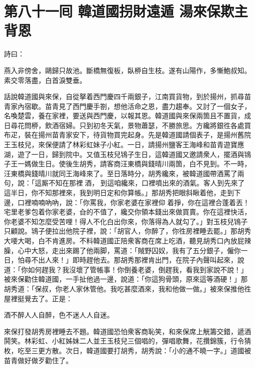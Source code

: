 
\chapter*{第八十一囘 韓道國拐財遠遁 湯來保欺主背恩}


詩曰：

燕入非傍舍，鷗歸只故池。斷橋無復板，臥桺自生枝。遂有山陽作，多慚鮑叔知。素交零落盡，白首淚雙垂。

話說韓道國與來保，自從拏着西門慶四千兩銀子，江南買貨物，到於揚州，抓尋苗青家內宿歇。苗青見了西門慶手劄，想他活命之恩，盡力趨奉。又討了一個女子，名喚楚雲，養在家裡，要送與西門慶，以報其恩。韓道國與來保兩箇且不置貨，成日尋花問桺，飲酒宿婦。{}只到初冬天氣，景物蕭瑟，不勝旅思。方纔將銀徃各處買布疋，裝在揚州苗青家安下，待貨物買完起身。先是韓道國請個表子，是揚州舊院王玉枝兒，來保便請了林彩虹妹子小紅。一日，請揚州鹽客王海峰和苗青遊寶應湖，遊了一日，歸到院中。又值玉枝兒鴇子生日，{}這韓道國又邀請衆人，擺酒與鴇子王一媽做生日。使後生胡秀，請客商汪東橋與錢晴川兩箇，白不見到。不一時，汪東橋與錢晴川就同王海峰來了。至日落時分，胡秀纔來，被韓道國帶酒罵了兩句，說：「這厮不知在那裡𠳹酒，𠳹到這咱纔來，口裡噴出來的酒氣。客人到先來了這半日，你不知那裡來，我到明日定和你算帳。」那胡秀把眼斜瞅着他，走到下邊，口裡喃喃吶吶，說：「你罵我，你家老婆在家裡仰𢵞着掙，你在這裡合蓬着丟！宅里老爹包着你家老婆，㒲的不值了，纔交你領本錢出來做買賣。你在這裡快活，你老婆不知怎麼受苦哩！得人不化白出你來，你落得為人就勾了。」{}對玉枝兒鴇子只顧說。鴇子便拉出他院子裡，說：「胡官人，你醉了，你徃房裡睡去罷。」那胡秀大喓大喝，白不肯進房。不料韓道國正陪衆客商在席上吃酒，聽見胡秀口內放屁辣臊，心中大怒，走出來踢了他兩脚，罵道：「賊野囚奴，我有了五分銀子，僱你一日，怕尋不出人來！」{}即時趕他去。那胡秀那裡肯出門，在院子內聲叫起來，說道：「你如何趕我？我沒壞了管帳事！你倒養老婆，倒趕我，看我到家說不說！」{}被來保勸住韓道國，一手扯他過一邊，說道：「你這狗骨頭，原來這等酒硬！」那胡秀道：「保叔，你老人家休管他。我吃甚麼酒來，我和他做一做。」被來保推他徃屋裡挺覺去了。正是：

酒不醉人人自醉，色不迷人人自迷。

來保打發胡秀房裡睡去不題。韓道國恐怕衆客商恥笑，和來保席上觥籌交錯，遞酒鬨笑。林彩虹、小紅姊妹二人並王玉枝兒三個唱的，彈唱歌舞，花攢錦簇，行令猜枚，吃至三更方散。次日，韓道國要打胡秀，胡秀說：「小的通不曉一字。」{}道國被苗青做好做歹勸住了。

